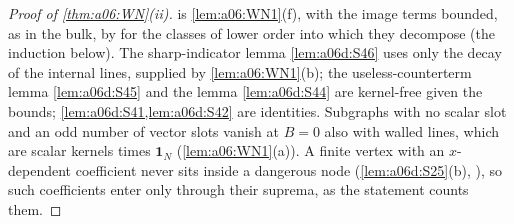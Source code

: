 \begin{proof}[Proof of \cref{thm:a06:WN}\textup{(ii)}]
\cite[pp.~418--419]{Ba3} is \cref{lem:a06:WN1}(f), with the image terms bounded, as in the bulk, by \cite[(1.33)]{Ba3} for the classes of lower order into which they decompose (the induction below). The sharp-indicator lemma \cref{lem:a06d:S46} uses only the decay of the internal lines, supplied by \cref{lem:a06:WN1}(b); the useless-counterterm lemma \cref{lem:a06d:S45} and the \cite[(2.4)]{Ba3} lemma \cref{lem:a06d:S44} are kernel-free given the bounds; \cref{lem:a06d:S41,lem:a06d:S42} are identities. Subgraphs with no scalar slot and an odd number of vector slots vanish at $B=0$ also with walled lines, which are scalar kernels times $\mathbf 1_N$ (\cref{lem:a06:WN1}(a)). A finite \cite[(1.7)]{Ba3} vertex with an $x$-dependent coefficient never sits inside a dangerous node (\cref{lem:a06d:S25}(b), \cite[Cor.~2.3]{Ba3}), so such coefficients enter only through their suprema, as the statement counts them.


\end{proof}
